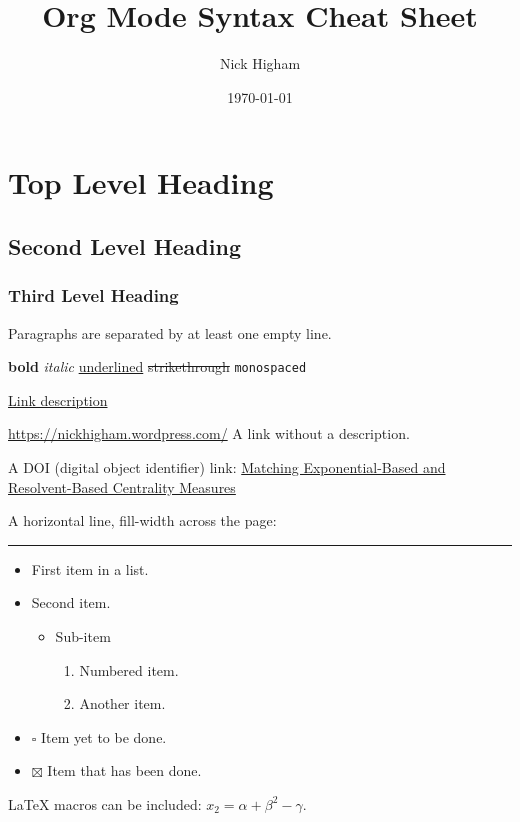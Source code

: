 \documentclass[11pt]{article}
\author{Nick Higham}
\date{\today}
\title{Org Mode Syntax Cheat Sheet}
\begin{document}
\maketitle

\section{Top Level Heading}
\label{sec:org598edd9}
\subsection{Second Level Heading}
\label{sec:org431a9ba}
\subsubsection{Third Level Heading}
\label{sec:org0117eb8}

Paragraphs are separated by at least one empty line.

\textbf{bold} \emph{italic} \uline{underlined} \sout{strikethrough} \texttt{monospaced}

\href{https://nickhigham.wordpress.com/}{Link description}

\url{https://nickhigham.wordpress.com/} A link without a description.

A DOI (digital object identifier) link: 
\href{https://doi.org/10.1093/comnet/cnv016}{Matching Exponential-Based and Resolvent-Based Centrality Measures}

A horizontal line, fill-width across the page:

\rule{\linewidth}{0.5pt}

\begin{itemize}
\item First item in a list.
\item Second item.
\begin{itemize}
\item Sub-item
\begin{enumerate}
\item Numbered item.
\item Another item.
\end{enumerate}
\end{itemize}
\item $\square$ Item yet to be done.
\item $\boxtimes$ Item that has been done.
\end{itemize}

\LaTeX{} macros can be included: \(x_2 = \alpha + \beta^2 - \gamma\).
\end{document}
